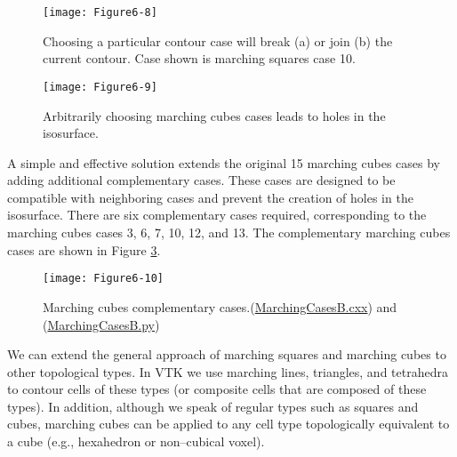 \begin{figure}[!htb]
	\centering
	\texttt{[image: Figure6-8]}\\
	\caption{Choosing a particular contour case will break (a) or join (b) the current contour. Case shown is marching squares case 10.}
	\label{fig:Figure6-8}
\end{figure}

\begin{figure}[!htb]
	\centering
	\texttt{[image: Figure6-9]}\\
	\caption{Arbitrarily choosing marching cubes cases leads to holes in the isosurface.}
	\label{fig:Figure6-9}
\end{figure}

A simple and effective solution extends the original 15 marching cubes cases by adding additional complementary cases. These cases are designed to be compatible with neighboring cases and prevent the creation of holes in the isosurface. There are six complementary cases required, corresponding to the marching cubes cases 3, 6, 7, 10, 12, and 13. The complementary marching cubes cases are shown in Figure \ref{fig:Figure6-10}.

\begin{figure}[!htb]
	\centering
	\texttt{[image: Figure6-10]}\\
	\caption{Marching cubes complementary cases.(\href{https://lorensen.github.io/VTKExamples/site/Cxx/VisualizationAlgorithms/MarchingCasesB/}{MarchingCasesB.cxx}) and (\href{https://lorensen.github.io/VTKExamples/site/Python/VisualizationAlgorithms/MarchingCasesB/}{MarchingCasesB.py})}
	\label{fig:Figure6-10}
\end{figure}

We can extend the general approach of marching squares and marching cubes to other topological types. In VTK we use marching lines, triangles, and tetrahedra to contour cells of these types (or composite cells that are composed of these types). In addition, although we speak of regular types such as squares and cubes, marching cubes can be applied to any cell type topologically equivalent to a cube (e.g., hexahedron or non--cubical voxel).

